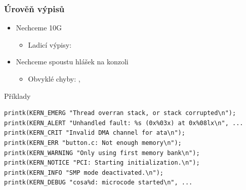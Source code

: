 \begin{frame}[fragile]
  \frametitle{Úrověň výpisů}

  \begin{itemize}
    \item Nechceme 10G 
    \begin{itemize}
      \item Ladicí výpisy: 
    \end{itemize}

    \pause

    \item Nechceme spoustu hlášek na konzoli
    \begin{itemize}
      \item Obvyklé chyby: , 
    \end{itemize}
  \end{itemize}

  \pause

  \begin{block}{Příklady}
  \begin{lstlisting}
printk(KERN_EMERG "Thread overran stack, or stack corrupted\n");
printk(KERN_ALERT "Unhandled fault: %s (0x%03x) at 0x%08lx\n", ...
printk(KERN_CRIT "Invalid DMA channel for ata\n");
printk(KERN_ERR "button.c: Not enough memory\n");
printk(KERN_WARNING "Only using first memory bank\n");
printk(KERN_NOTICE "PCI: Starting initialization.\n");
printk(KERN_INFO "SMP mode deactivated.\n");
printk(KERN_DEBUG "cosa%d: microcode started\n", ...
  \end{lstlisting} %
  \end{block}

\end{frame}

